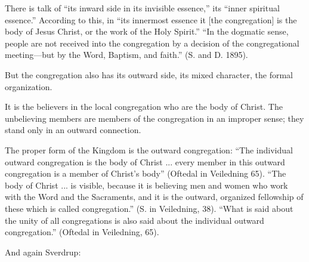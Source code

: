There is talk of “its inward side in its invisible essence,” its “inner spiritual essence.” According to this, in “its innermost essence it [the congregation] is the body of Jesus Christ, or the work of the Holy Spirit.” “In the dogmatic sense, people are not received into the congregation by a decision of the congregational meeting—but by the Word, Baptism, and faith.” (S. and D. 1895).

But the congregation also has its outward side, its mixed character, the formal organization.

It is the believers in the local congregation who are the body of Christ. The unbelieving members are members of the congregation in an improper sense; they stand only in an outward connection.

The proper form of the Kingdom is the outward congregation: “The individual outward congregation is the body of Christ ... every member in this outward congregation is a member of Christ’s body” (Oftedal in Veiledning 65). “The body of Christ ... is visible, because it is believing men and women who work with the Word and the Sacraments, and it is the outward, organized fellowship of these which is called congregation.” (S. in Veiledning, 38). “What is said about the unity of all congregations is also said about the individual outward congregation.” (Oftedal in Veiledning, 65).

And again Sverdrup:

